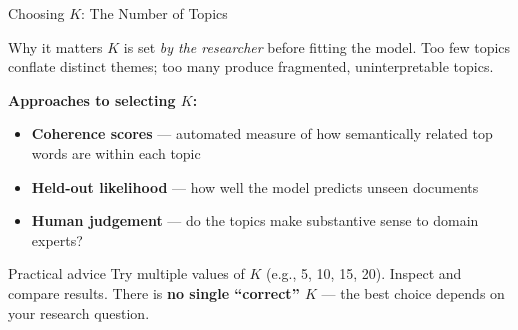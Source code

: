 \documentclass[aspectratio=169]{beamer}
\begin{document}
\begin{frame}{Choosing \(K\): The Number of Topics}
    \begin{alertblock}{Why it matters}
        \(K\) is set \textit{by the researcher} before fitting the model. Too few topics conflate distinct themes; too many produce fragmented, uninterpretable topics.
    \end{alertblock}

    \textbf{Approaches to selecting \(K\):}
    \begin{itemize}\setlength\itemsep{0pt}
        \item {} \textbf{Coherence scores} --- automated measure of how semantically related top words are within each topic
        \item {} \textbf{Held-out likelihood} --- how well the model predicts unseen documents
        \item {} \textbf{Human judgement} --- do the topics make substantive sense to domain experts?
    \end{itemize}

    \vspace{0.2cm}
    \begin{exampleblock}{Practical advice}
        \footnotesize
        Try multiple values of \(K\) (e.g., 5, 10, 15, 20). Inspect and compare results. There is \textbf{no single ``correct'' \(K\)} --- the best choice depends on your research question.
    \end{exampleblock}
\end{frame}
\end{document}
